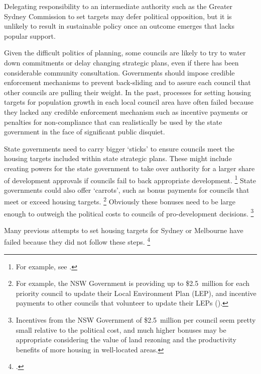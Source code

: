 Delegating responsibility to an intermediate authority such as the Greater Sydney Commission to set targets may defer political opposition, but it is unlikely to result in sustainable policy once an outcome emerges that lacks popular support.

Given the difficult politics of planning, some councils are likely to try to water down commitments or delay changing strategic plans, even if there has been considerable community consultation. Governments should impose credible enforcement mechanisms to prevent back-sliding and to assure each council that other councils are pulling their weight.
In the past, processes for setting housing targets for population growth in each local council area have often failed because they lacked any credible enforcement mechanism such as incentive payments or penalties for non-compliance that can realistically be used by the state government in the face of significant public disquiet.

State governments need to carry bigger `sticks' to ensure councils meet the housing targets included within state strategic plans.
These might include creating powers for the state government to take over authority for a larger share of development approvals if councils fail to back appropriate development.%
	\footnote{For example, see \textcite{Daley-etal-2017-Submission-NSW-housing-supply-inquiry}.}
State governments could also offer `carrots', such as bonus payments for councils that meet or exceed housing targets.%
	\footnote{For example, the NSW Government is providing up to \$2.5~million for each priority council to update their Local Environment Plan (LEP), and incentive payments to other councils that volunteer to update their LEPs (\textcite{NSWGovFirstHome2017}).}
Obviously these bonuses need to be large enough to outweigh the political costs to councils of pro-development decisions.%
	\footnote{Incentives from the NSW Government of \$2.5~million per council seem pretty small relative to the political cost, and much higher bonuses may be appropriate considering the value of land rezoning and the productivity benefits of more housing in well-located areas.}

Many previous attempts to set housing targets for Sydney or Melbourne have failed because they did not follow these steps.%
	\footcites[][Table~2]{Property-Council-2015-Missing-the-mark}[][9]{UDIA-NSW-2017-Making-housing-more-affordable}[][13]{Property-Council-2017-submission-NSW-inquiry}[][46]{GSC-2017-draftplan}

